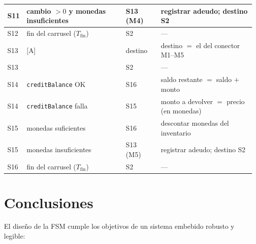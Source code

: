 \documentclass[12pt,a4paper]{article}
\begin{document}
{\begin{longtable}{@{}p{1.0cm}p{5.5cm}p{1.9cm}p{5.5cm}@{}}
S11 & cambio $>0$ y monedas insuficientes         & S13 (M4) & registrar adeudo; destino S2\\ \hline
S12 & fin del carrusel ($T_{\mathrm{fin}}$)       & S2  & ---\\ \hline
S13 & {[A]}                                       & destino & destino $=$ el del conector M1--M5\\
S13 & \tin{}                                      & S2  & ---\\ \hline
S14 & \texttt{creditBalance} OK                   & S16 & saldo restante $=$ saldo $+$ monto\\
S14 & \texttt{creditBalance} falla                & S15 & monto a devolver $=$ precio (en monedas)\\ \hline
S15 & monedas suficientes                         & S16 & descontar monedas del inventario\\
S15 & monedas insuficientes                       & S13 (M5) & registrar adeudo; destino S2\\ \hline
S16 & fin del carrusel ($T_{\mathrm{fin}}$)       & S2  & ---\\
\end{longtable}
}

\section{Conclusiones}

El diseño de la FSM cumple los objetivos de un sistema embebido robusto
y legible:
\end{document}
